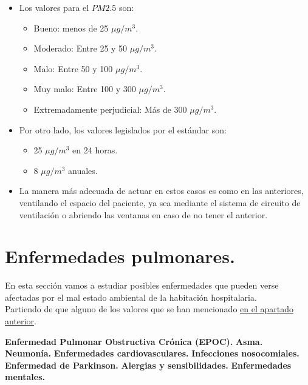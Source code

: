 \begin{itemize}
\begin{itemize}
                    \newpage
    			\item Los valores para el $PM2.5$ son:
    			\begin{itemize}
    				\item Bueno: menos de 25 $\mu g/m^3$.\cite{Calidad_nivel_PM25}
    				\item Moderado: Entre 25 y 50 $\mu g/m^3$.\cite{Calidad_nivel_PM25}
    				\item Malo: Entre 50 y 100 $\mu g/m^3$.\cite{Calidad_nivel_PM25}
    				\item Muy malo: Entre 100 y 300 $\mu g/m^3$.\cite{Calidad_nivel_PM25}
    				\item Extremadamente perjudicial: Más de 300 $\mu g/m^3$.\cite{Calidad_nivel_PM25}
    			\end{itemize}
    			\item Por otro lado, los valores legislados por el estándar son:
    			\begin{itemize}
    				\item 25 $\mu g/m^3$ en 24 horas.\cite{Calidad_nivel_PM25}
    				\item 8 $\mu g/m^3$ anuales.\cite{Calidad_nivel_PM25}
    			\end{itemize}
    			\item La manera más adecuada de actuar en estos casos es como en las anteriores, ventilando el espacio del paciente, ya sea mediante el sistema de circuito de ventilación o abriendo las ventanas en caso de no tener el anterior.
    		\end{itemize}
    \end{itemize}
\newpage
\section{Enfermedades pulmonares.}

    En esta sección vamos a estudiar posibles enfermedades que pueden verse afectadas por el mal estado ambiental de la habitación hospitalaria. 
    \\Partiendo de que alguno de los valores que se han mencionado  \hyperref[sec:elementosAmbientalesHabitacion]{en el apartado anterior}.

    \vskip 0.2in
    {\large \textbf{Enfermedad Pulmonar Obstructiva Crónica (EPOC).}}
    \vskip 0.2in
    {\large \textbf{Asma.}}
    \vskip 0.2in
    {\large \textbf{Neumonía.}}
    \vskip 0.2in
    {\large \textbf{Enfermedades cardiovasculares.}}
    \vskip 0.2in
    {\large \textbf{Infecciones nosocomiales.}}
    \vskip 0.2in
    {\large \textbf{Enfermedad de Parkinson.}}
    \vskip 0.2in
    {\large \textbf{Alergias y sensibilidades.}}
    \vskip 0.2in
    {\large \textbf{Enfermedades mentales.}}
    \vskip 0.2in



